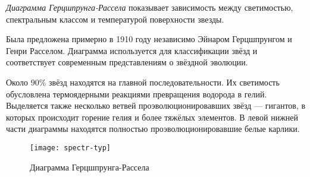 \textit{Диаграмма Герцшпрунга-Рассела} показывает зависимость между светимостью, спектральным классом и температурой поверхности звезды. 

Была предложена примерно в 1910 году независимо Эйнаром Герцшпрунгом и Генри Расселом. Диаграмма используется для классификации звёзд и соответствует современным представлениям о звёздной эволюции.

Около $90 \%$ звёзд находятся на главной последовательности. Их светимость обусловлена термоядерными реакциями превращения водорода в гелий. Выделяется также несколько ветвей проэволюционировавших звёзд --- гигантов, в которых происходит горение гелия и более тяжёлых элементов. В левой нижней части диаграммы находятся полностью проэволюционировавшие белые карлики.

\begin{center}
\begin{figure}[h!]
\begin{center}
\texttt{[image: spectr-typ]}
\end{center}
\caption{Диаграмма Герцшпрунга-Рассела}
\end{figure}
\end{center}